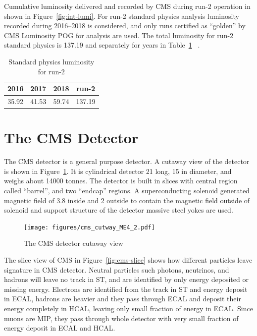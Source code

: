 Cumulative luminosity delivered and recorded by \gls{CMS} during run-2 operation
in shown in Figure~\ref{fig:int-lumi}.
For run-2 standard physics analysis luminosity recorded during
2016--2018 is considered, and only runs certified as ``golden'' by \gls{CMS}
Luminosity \gls{POG} for analysis are used. The total luminosity for run-2
standard physics is 137.19\fbinv{}
and separately for years in Table~\ref{tab:years-lumi}
~\cite{CMS-PAS-LUM-17-001,CMS-PAS-LUM-17-004,CMS-PAS-LUM-18-002}.

\begin{table}[!ht]
  \centering
  \caption[Standard physics luminosity for run-2]%
  {Standard physics luminosity for run-2}
  \begin{tabular}{cccc}
    \toprule
    2016          & 2017          & 2018          & run-2          \\ \midrule
    35.92\fbinv{} & 41.53\fbinv{} & 59.74\fbinv{} & 137.19\fbinv{} \\
    \bottomrule
  \end{tabular}%
  \label{tab:years-lumi}
\end{table}

\section{
  The CMS Detector
 }\label{ch_cms:cms}

The \gls{CMS} detector is a general purpose detector.
A cutaway view of the detector is shown in Figure~\ref{fig:cms-cutaway}.
It is cylindrical detector 21\m{} long, 15\m{} in diameter,
and weighs about 14000 tonnes.
The detector is built in slices with central region called ``barrel'',
and two ``endcap'' regions.
A superconducting solenoid generated magnetic field of 3.8\Tesla{} inside
and 2\Tesla{} outside to contain the magnetic field outside of solenoid
and support structure of the detector massive steel yokes are used.

\begin{figure}[!ht]
  \centering
  \texttt{[image: figures/cms\_cutway\_ME4\_2.pdf]}
  \caption[The CMS detector cutaway view]%
  {The CMS detector cutaway view~\cite{image-cms-cutway}}%
  \label{fig:cms-cutaway}
\end{figure}

The slice view of \gls{CMS} in Figure~\ref{fig:cms-slice}
shows how different particles leave signature in \gls{CMS} detector.
Neutral particles such photons, neutrinos, and hadrons will leave no track
in \gls{ST}, and are identified by only energy deposited or missing energy.
Electrons are identified from the track in \gls{ST} and energy deposit
in \gls{ECAL}, hadrons are heavier and they pass through \gls{ECAL}
and deposit their energy completely in \gls{HCAL}, leaving only small fraction
of energy in \gls{ECAL}.
Since muons are \gls{MIP}, they pass through whole detector with very small
fraction of energy deposit in \gls{ECAL} and \gls{HCAL}.

